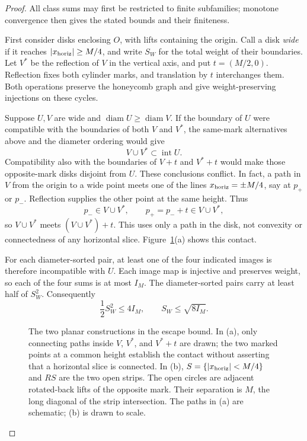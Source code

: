 \begin{proof}
All class sums may first be restricted to finite subfamilies; monotone
convergence then gives the stated bounds and their finiteness.

First consider disks enclosing \(O\), with lifts containing the origin.
Call a disk \emph{wide} if it reaches \(|x_{\rm horiz}|\ge M/4\), and
write \(S_W\) for the total weight of their boundaries. Let \(V^*\) be
the reflection of \(V\) in the vertical axis, and put \(t=(M/2,0)\).
Reflection fixes both cylinder marks, and translation by \(t\)
interchanges them. Both operations preserve the honeycomb graph and
give weight-preserving injections on these cycles.

Suppose \(U,V\) are wide and
\(\operatorname{diam}U\ge\operatorname{diam}V\). If the boundary of
\(U\) were compatible with the boundaries of both \(V\) and \(V^*\), the same-mark
alternatives above and the diameter ordering would give
\[
 V\cup V^*\subset\operatorname{int}U.
\]
Compatibility also with the boundaries of \(V+t\) and \(V^*+t\) would make those
opposite-mark disks disjoint from \(U\). These conclusions conflict.
In fact, a path in \(V\) from the origin to a wide point meets one of
the lines \(x_{\rm horiz}=\pm M/4\), say at \(p_+\) or \(p_-\).
Reflection supplies the other point at the same height. Thus
\[
 p_-\in V\cup V^*,\qquad
 p_+=p_-+t\in V\cup V^*,
\]
so \(V\cup V^*\) meets \((V\cup V^*)+t\). This uses only a path in the
disk, not convexity or connectedness of any horizontal slice.
Figure~\ref{j:fig-localization}(a) shows this contact.

For each diameter-sorted pair, at least one of the four indicated
images is therefore incompatible with \(U\). Each image map is
injective and preserves weight, so each of the four sums is at most
\(I_M\). The diameter-sorted pairs carry at least half of \(S_W^2\).
Consequently
\[
 \frac12S_W^2\le4I_M,\qquad S_W\le\sqrt{8I_M}.
\]

\begin{figure}[ht]
\centering

\caption{The two planar constructions in the escape bound.
In (a), only connecting paths inside \(V\), \(V^*\), and \(V^*+t\)
are drawn; the two marked points at a common height establish the contact without
asserting that a horizontal slice is connected. In (b),
\(S=\{|x_{\rm horiz}|<M/4\}\) and \(RS\) are the two open strips.
The open circles are adjacent rotated-back lifts of the opposite mark.
Their separation is \(M\), the long diagonal of the strip intersection.
The paths in (a) are schematic; (b) is drawn to scale.}\label{j:fig-localization}
\end{figure}


\end{proof}
